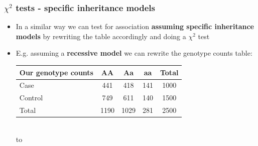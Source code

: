 \documentclass[xcolor=pdftex,dvipsnames,table,10pt]{beamer}
\begin{document}

\begin{frame}
\frametitle{$\chi^2$ tests - specific inheritance models}
\vspace{-.1cm}
\small
  \begin{itemize}
   \item<1-> In a similar way we can test for association \textbf{assuming specific inheritance models} by rewriting the table accordingly and doing a $\chi^2$ test 
   \item<2-> E.g. assuming a \textbf{recessive model} we can rewrite the genotype counts table: %
    \\\vspace{.2cm}
   \footnotesize
\begin{tabular}{|l|c|c|c|c|}
\hline
 \textbf{Our genotype counts} & AA & Aa & aa & Total \\
\hline
Case & 441 & 418\hspace{0.16cm} & 141\hspace{0.185cm} & 1000\\
\hline
Control & 749 & 611\hspace{0.16cm} & 140\hspace{0.185cm} & 1500  \\
\hline
Total & 1190 & 1029 & 281 & 2500\\
\hline
\end{tabular}\\\vspace{0.2cm}
\small to\\\vspace{0.2cm}

\end{itemize}
\end{frame}
\end{document}
